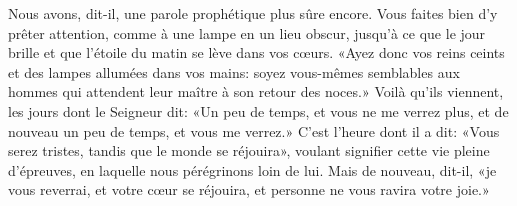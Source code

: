 Nous avons, dit-il, une parole prophétique plus sûre encore.
Vous faites bien d’y prêter attention, comme à une lampe en un lieu obscur,
	jusqu’à ce que le jour brille
		et que l’étoile du matin se lève dans vos cœurs.
«Ayez donc vos reins ceints et des lampes allumées dans vos mains:
	soyez vous-mêmes semblables aux hommes
		qui attendent leur maître à son retour des noces.»
Voilà qu’ils viennent, les jours dont le Seigneur dit:
	«Un peu de temps, et vous ne me verrez plus,
	et de nouveau un peu de temps, et vous me verrez.»
C’est l’heure dont il a dit:
	«Vous serez tristes, tandis que le monde se réjouira»,
	voulant signifier cette vie pleine d’épreuves,
	en laquelle nous pérégrinons loin de lui.
Mais de nouveau, dit-il, «je vous reverrai, et votre cœur se réjouira,
	et personne ne vous ravira votre joie.»
